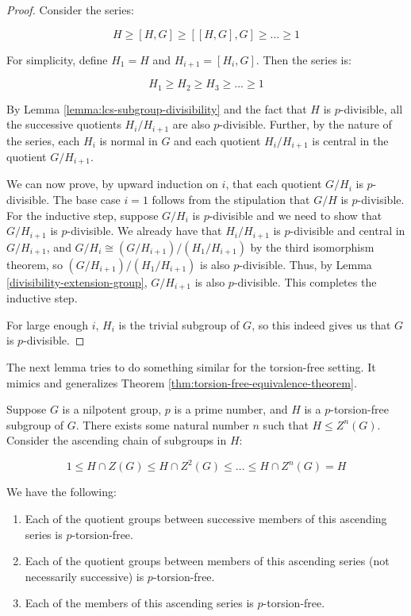 \documentclass{ucetd}
\begin{document}
\begin{proof}
  Consider the series:

  $$H \ge [H,G] \ge [[H,G],G] \ge \dots \ge 1$$

  For simplicity, define $H_1 = H$ and $H_{i+1} = [H_i,G]$. Then the series is:

  $$H_1 \ge H_2 \ge H_3 \ge \dots \ge 1$$

  By Lemma \ref{lemma:lcs-subgroup-divisibility} and the fact that $H$ is
  $p$-divisible, all the successive quotients $H_i/H_{i+1}$ are also
  $p$-divisible. Further, by the nature of the series, each $H_i$ is
  normal in $G$ and each quotient $H_i/H_{i+1}$ is central in the
  quotient $G/H_{i+1}$.

  We can now prove, by upward induction on $i$, that each quotient
  $G/H_i$ is $p$-divisible. The base case $i = 1$ follows from the
  stipulation that $G/H$ is $p$-divisible. For the inductive step,
  suppose $G/H_i$ is $p$-divisible and we need to show that
  $G/H_{i+1}$ is $p$-divisible. We already have that $H_i/H_{i+1}$ is
  $p$-divisible and central in $G/H_{i+1}$, and $G/H_i \cong
  (G/H_{i+1})/(H_1/H_{i+1})$ by the third isomorphism theorem, so $
  (G/H_{i+1})/(H_1/H_{i+1})$ is also $p$-divisible. Thus, by Lemma
  \ref{divisibility-extension-group}, $G/H_{i+1}$ is also
  $p$-divisible. This completes the inductive step.

  For large enough $i$, $H_i$ is the trivial subgroup of $G$, so this
  indeed gives us that $G$ is $p$-divisible.
\end{proof}

The next lemma tries to do something similar for the torsion-free
setting. It mimics and generalizes Theorem
\ref{thm:torsion-free-equivalence-theorem}.

\begin{lemma}
  Suppose $G$ is a nilpotent group, $p$ is a prime number, and $H$ is
  a $p$-torsion-free subgroup of $G$. There exists some natural number
  $n$ such that $H \le Z^n(G)$. Consider the ascending chain of
  subgroups in $H$:

  $$1 \le H \cap Z(G) \le H \cap Z^2(G) \le \dots \le H \cap Z^n(G) = H$$

  We have the following:

  \begin{enumerate}
  \item Each of the quotient groups between successive members of this
    ascending series is $p$-torsion-free.
  \item Each of the quotient groups between members of this ascending
    series (not necessarily successive) is $p$-torsion-free.
  \item Each of the members of this ascending series is $p$-torsion-free.
  \end{enumerate}
\end{lemma}
\end{document}
